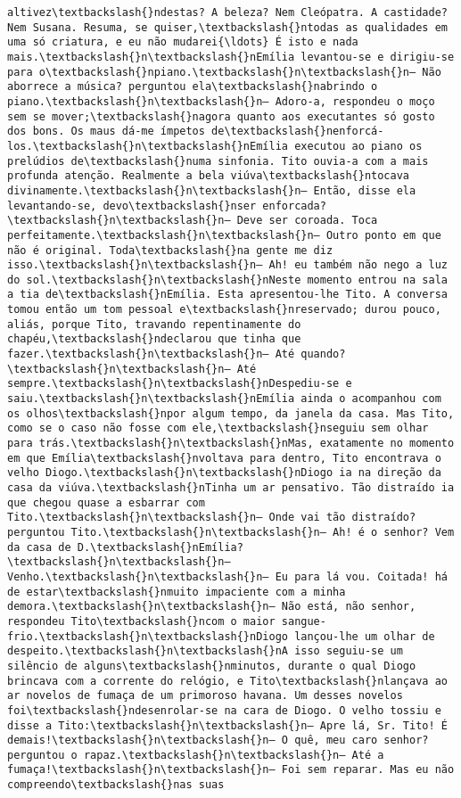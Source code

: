 \begin{Verbatim}[commandchars=\\\{\}]
altivez\textbackslash{}ndestas? A beleza? Nem Cleópatra. A castidade? Nem Susana. Resuma, se quiser,\textbackslash{}ntodas as qualidades em uma só criatura, e eu não mudarei{\ldots} É isto e nada mais.\textbackslash{}n\textbackslash{}nEmília levantou-se e dirigiu-se para o\textbackslash{}npiano.\textbackslash{}n\textbackslash{}n— Não aborrece a música? perguntou ela\textbackslash{}nabrindo o piano.\textbackslash{}n\textbackslash{}n— Adoro-a, respondeu o moço sem se mover;\textbackslash{}nagora quanto aos executantes só gosto dos bons. Os maus dá-me ímpetos de\textbackslash{}nenforcá-los.\textbackslash{}n\textbackslash{}nEmília executou ao piano os prelúdios de\textbackslash{}numa sinfonia. Tito ouvia-a com a mais profunda atenção. Realmente a bela viúva\textbackslash{}ntocava divinamente.\textbackslash{}n\textbackslash{}n— Então, disse ela levantando-se, devo\textbackslash{}nser enforcada?\textbackslash{}n\textbackslash{}n— Deve ser coroada. Toca perfeitamente.\textbackslash{}n\textbackslash{}n— Outro ponto em que não é original. Toda\textbackslash{}na gente me diz isso.\textbackslash{}n\textbackslash{}n— Ah! eu também não nego a luz do sol.\textbackslash{}n\textbackslash{}nNeste momento entrou na sala a tia de\textbackslash{}nEmília. Esta apresentou-lhe Tito. A conversa tomou então um tom pessoal e\textbackslash{}nreservado; durou pouco, aliás, porque Tito, travando repentinamente do chapéu,\textbackslash{}ndeclarou que tinha que fazer.\textbackslash{}n\textbackslash{}n— Até quando?\textbackslash{}n\textbackslash{}n— Até sempre.\textbackslash{}n\textbackslash{}nDespediu-se e saiu.\textbackslash{}n\textbackslash{}nEmília ainda o acompanhou com os olhos\textbackslash{}npor algum tempo, da janela da casa. Mas Tito, como se o caso não fosse com ele,\textbackslash{}nseguiu sem olhar para trás.\textbackslash{}n\textbackslash{}nMas, exatamente no momento em que Emília\textbackslash{}nvoltava para dentro, Tito encontrava o velho Diogo.\textbackslash{}n\textbackslash{}nDiogo ia na direção da casa da viúva.\textbackslash{}nTinha um ar pensativo. Tão distraído ia que chegou quase a esbarrar com Tito.\textbackslash{}n\textbackslash{}n— Onde vai tão distraído? perguntou Tito.\textbackslash{}n\textbackslash{}n— Ah! é o senhor? Vem da casa de D.\textbackslash{}nEmília?\textbackslash{}n\textbackslash{}n— Venho.\textbackslash{}n\textbackslash{}n— Eu para lá vou. Coitada! há de estar\textbackslash{}nmuito impaciente com a minha demora.\textbackslash{}n\textbackslash{}n— Não está, não senhor, respondeu Tito\textbackslash{}ncom o maior sangue-frio.\textbackslash{}n\textbackslash{}nDiogo lançou-lhe um olhar de despeito.\textbackslash{}n\textbackslash{}nA isso seguiu-se um silêncio de alguns\textbackslash{}nminutos, durante o qual Diogo brincava com a corrente do relógio, e Tito\textbackslash{}nlançava ao ar novelos de fumaça de um primoroso havana. Um desses novelos foi\textbackslash{}ndesenrolar-se na cara de Diogo. O velho tossiu e disse a Tito:\textbackslash{}n\textbackslash{}n— Apre lá, Sr. Tito! É demais!\textbackslash{}n\textbackslash{}n— O quê, meu caro senhor? perguntou o rapaz.\textbackslash{}n\textbackslash{}n— Até a fumaça!\textbackslash{}n\textbackslash{}n— Foi sem reparar. Mas eu não compreendo\textbackslash{}nas suas 
\end{Verbatim}

